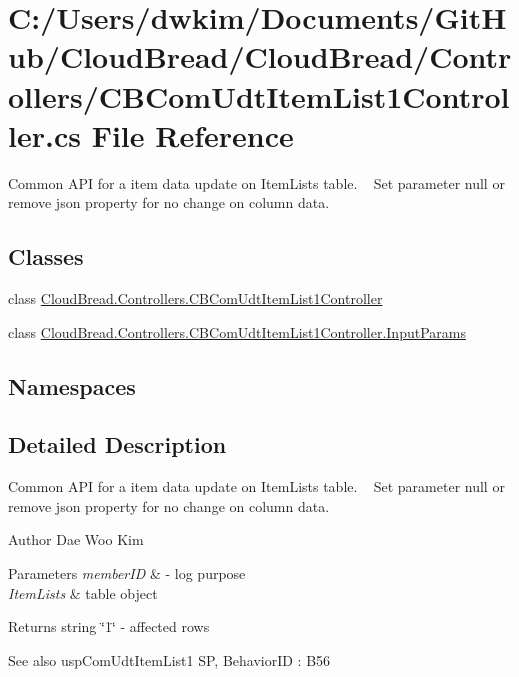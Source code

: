 \hypertarget{a00208}{}\section{C\+:/\+Users/dwkim/\+Documents/\+Git\+Hub/\+Cloud\+Bread/\+Cloud\+Bread/\+Controllers/\+C\+B\+Com\+Udt\+Item\+List1\+Controller.cs File Reference}
\label{a00208}


Common A\+PI for a item data update on Item\+Lists table. ~\newline
Set parameter null or remove json property for no change on column data.  


\subsection*{Classes}
\begin{DoxyCompactItemize}
\item 
class \hyperlink{a00035}{Cloud\+Bread.\+Controllers.\+C\+B\+Com\+Udt\+Item\+List1\+Controller}
\item 
class \hyperlink{a00094}{Cloud\+Bread.\+Controllers.\+C\+B\+Com\+Udt\+Item\+List1\+Controller.\+Input\+Params}
\end{DoxyCompactItemize}
\subsection*{Namespaces}
\begin{DoxyCompactItemize}
\end{DoxyCompactItemize}


\subsection{Detailed Description}
Common A\+PI for a item data update on Item\+Lists table. ~\newline
Set parameter null or remove json property for no change on column data. 

\begin{DoxyAuthor}{Author}
Dae Woo Kim 
\end{DoxyAuthor}

\begin{DoxyParams}{Parameters}
{\em member\+ID} & -\/ log purpose \\
\hline
{\em Item\+Lists} & table object \\
\hline
\end{DoxyParams}
\begin{DoxyReturn}{Returns}
string \char`\"{}1\char`\"{} -\/ affected rows 
\end{DoxyReturn}
\begin{DoxySeeAlso}{See also}
usp\+Com\+Udt\+Item\+List1 SP, Behavior\+ID \+: B56 
\end{DoxySeeAlso}
